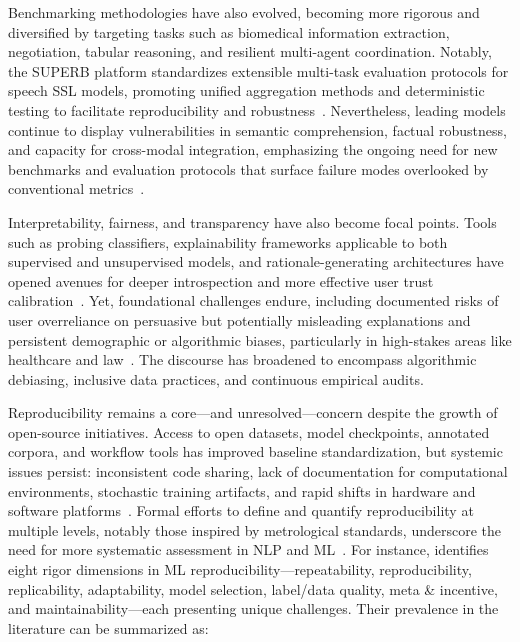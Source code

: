 \documentclass[sigconf]{acmart}
\begin{document}
Benchmarking methodologies have also evolved, becoming more rigorous and diversified by targeting tasks such as biomedical information extraction, negotiation, tabular reasoning, and resilient multi-agent coordination. Notably, the SUPERB platform standardizes extensible multi-task evaluation protocols for speech SSL models, promoting unified aggregation methods and deterministic testing to facilitate reproducibility and robustness~\cite{ref101}. Nevertheless, leading models continue to display vulnerabilities in semantic comprehension, factual robustness, and capacity for cross-modal integration, emphasizing the ongoing need for new benchmarks and evaluation protocols that surface failure modes overlooked by conventional metrics~\cite{ref13,ref38,ref47,ref56,ref66,ref67,ref101}.

Interpretability, fairness, and transparency have also become focal points. Tools such as probing classifiers, explainability frameworks applicable to both supervised and unsupervised models, and rationale-generating architectures have opened avenues for deeper introspection and more effective user trust calibration~\cite{ref31,ref32,ref36,ref48,ref50,ref51,ref54,ref55}. Yet, foundational challenges endure, including documented risks of user overreliance on persuasive but potentially misleading explanations and persistent demographic or algorithmic biases, particularly in high-stakes areas like healthcare and law~\cite{ref31,ref33,ref36,ref39,ref45,ref53}. The discourse has broadened to encompass algorithmic debiasing, inclusive data practices, and continuous empirical audits.

Reproducibility remains a core—and unresolved—concern despite the growth of open-source initiatives. Access to open datasets, model checkpoints, annotated corpora, and workflow tools has improved baseline standardization, but systemic issues persist: inconsistent code sharing, lack of documentation for computational environments, stochastic training artifacts, and rapid shifts in hardware and software platforms~\cite{ref74,ref75,ref80,ref81,ref83,ref85,ref86,ref87,ref91}. Formal efforts to define and quantify reproducibility at multiple levels, notably those inspired by metrological standards, underscore the need for more systematic assessment in NLP and ML~\cite{ref13,ref66,ref67}. For instance, \cite{ref67} identifies eight rigor dimensions in ML reproducibility—repeatability, reproducibility, replicability, adaptability, model selection, label/data quality, meta \& incentive, and maintainability—each presenting unique challenges. Their prevalence in the literature can be summarized as:
\end{document}
